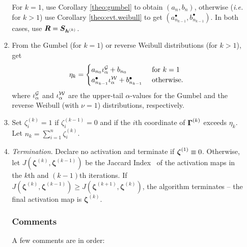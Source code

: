 \begin{enumerate}
\begin{enumerate}
  For $k=1$, use Corollary \ref{theo:gumbel} to obtain $(a_n,b_n)$,
  otherwise ({\em i.e.} for $k > 1$)
  use Corollary \ref{theo:evt.weibull} to get
  $(a^\bullet_{n_{k-1}},b_{n_{k-1}}^\bullet)$. In both cases,
use $\boldsymbol{R}=\boldsymbol{S}_{{\boldsymbol{h}}^{(k)}}$.
\item From the Gumbel (for $k=1$) or reverse Weibull distributions (for
  $k>1$), get
  \begin{equation}
    \label{gumbel.weibull.cutoff}
    \eta_k = \begin{cases} {a_{n_0}}\iota_{\alpha}^\mathcal G+ b_{n_0} &
      \mbox{ for }k=1\\
    {a^\bullet_{n_{k-1}}}  \iota_{\alpha}^\mathcal W + b^\bullet_{n_{k-1}}&
      \mbox{ otherwise. }\end{cases}
  \end{equation}
  where $\iota_{\alpha}^\mathcal G$ and $\iota_{\alpha}^\mathcal W$ are the
  upper-tail $\alpha$-values for the Gumbel and the reverse Weibull
  (with $\nu = 1$) distributions, respectively. 
\item Set $\zeta^{(k)}_i = 1$ if $\zeta^{(k-1)}_i = 0$ and if the
  $i$th coordinate of $\boldsymbol{\Gamma}^{(k)}$ exceeds $\eta_k$. Let $n_k=\sum_{i=1}^n\zeta_i^{(k)}$.
    \een
    \een
  \item {\em Termination}.
    \label{stop}
    Declare no activation and terminate if $\boldsymbol{\zeta}^{(1)}\equiv
    0$. Otherwise, let
    $J(\boldsymbol{\zeta}^{(k)},\boldsymbol{\zeta}^{(k-1)})$ be 
    the Jaccard Index~\citep{jaccard1901,maitra10} of the activation
    maps in the  $k$th and $(k-1)$th iterations.
    If $J(\boldsymbol{\zeta}^{(k)},\boldsymbol{\zeta}^{(k-1)}) \geq
    J(\boldsymbol{\zeta}^{(k+1)},\boldsymbol{\zeta}^{(k)})$,  the
    algorithm terminates -- the final activation map is $\boldsymbol{\zeta}^{(k)}$.
    \een
    
    \subsubsection*{Comments} A few comments are in order:

\end{enumerate}
\end{enumerate}
